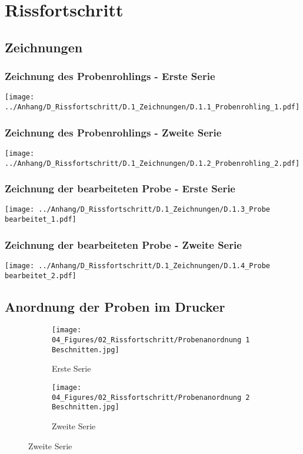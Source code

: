 \section{Rissfortschritt}
\let\cleardoublepage\clearpage
\subsection{Zeichnungen}
  \label{Zeichnungen}
  \newpage

  \subsubsection{Zeichnung des Probenrohlings - Erste Serie}
    \label{Zeichnung der Probe - Erste Serie}
    \texttt{[image: ../Anhang/D\_Rissfortschritt/D.1\_Zeichnungen/D.1.1\_Probenrohling\_1.pdf]}

  \subsubsection{Zeichnung des Probenrohlings - Zweite Serie}
    \label{Zeichnung der Probe - Zweite Serie}
    \texttt{[image: ../Anhang/D\_Rissfortschritt/D.1\_Zeichnungen/D.1.2\_Probenrohling\_2.pdf]}

  \subsubsection{Zeichnung der bearbeiteten Probe - Erste Serie}
    \label{Zeichnung des Probenrohlings - Erste Serie}
    \texttt{[image: ../Anhang/D\_Rissfortschritt/D.1\_Zeichnungen/D.1.3\_Probe bearbeitet\_1.pdf]}

  \subsubsection{Zeichnung der bearbeiteten Probe - Zweite Serie}
    \label{Zeichnung des Probenrohlings - Zweite Serie}
    \texttt{[image: ../Anhang/D\_Rissfortschritt/D.1\_Zeichnungen/D.1.4\_Probe bearbeitet\_2.pdf]}

  \subsection{Anordnung der Proben im Drucker}
  \label{Anordnung der Proben im Drucker}
    \begin{figure}[!ht]
      \centering
        \begin{subfigure}{.5\textwidth}
          \centering
          \texttt{[image: 04\_Figures/02\_Rissfortschritt/Probenanordnung 1 Beschnitten.jpg]}
          \caption{Erste Serie}
          \label{Erste Serie}
        \end{subfigure}%
        \begin{subfigure}{.5\textwidth}
          \centering
          \texttt{[image: 04\_Figures/02\_Rissfortschritt/Probenanordnung 2 Beschnitten.jpg]}
          \caption{Zweite Serie}
          \label{Zweite Serie}
        \end{subfigure}
    \end{figure}

